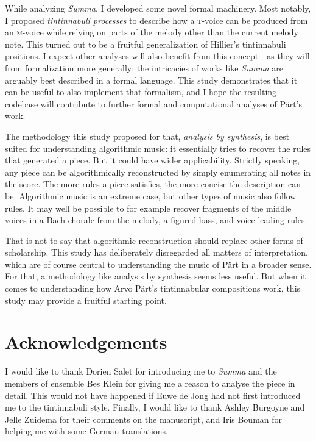 \documentclass{interact}
\newcommand{\MM}{\textsc{m}}
\newcommand{\TT}{\textsc{t}}
\begin{document}
While analyzing \emph{Summa}, I developed some novel formal machinery.
Most notably, I proposed \emph{tintinnabuli processes} to describe how a \TT-voice can be produced from an \MM-voice while relying on parts of the melody other than the current melody note. 
This turned out to be a fruitful generalization of Hillier's tintinnabuli positions.
I expect other analyses will also benefit from this concept---as they will from formalization more generally: the intricacies of works like \emph{Summa} are arguably best described in a formal language.
This study demonstrates that it can be useful to also implement that formalism, and I hope the resulting codebase will contribute to further formal and computational analyses of Pärt's work.


The methodology this study proposed for that, \emph{analysis by synthesis}, is best suited for understanding algorithmic music: it essentially tries to recover the rules that generated a piece.
But it could have wider applicability.
Strictly speaking, any piece can be algorithmically reconstructed by simply enumerating all notes in the score.
The more rules a piece satisfies, the more concise the description can be.
Algorithmic music is an extreme case, but other types of music also follow rules.
It may well be possible to for example recover fragments of the middle voices in a Bach chorale from the melody, a figured bass, and voice-leading rules.


That is not to say that algorithmic reconstruction should replace other forms of scholarship.
This study has deliberately disregarded all matters of interpretation, which are of course central to understanding the music of Pärt in a broader sense.
For that, a methodology like analysis by synthesis seems less useful.
But when it comes to understanding how Arvo Pärt's tintinnabular compositions work, this study may provide a fruitful starting point.


\section*{Acknowledgements}


I would like to thank Dorien Salet for introducing me to \emph{Summa} and the members of ensemble Bes Klein for giving me a reason to analyse the piece in detail.
This would not have happened if Euwe de Jong had not first introduced me to the tintinnabuli style.
Finally, I would like to thank Ashley Burgoyne and Jelle Zuidema for their comments on the manuscript, and Iris Bouman for helping me with some German translations.
\end{document}
